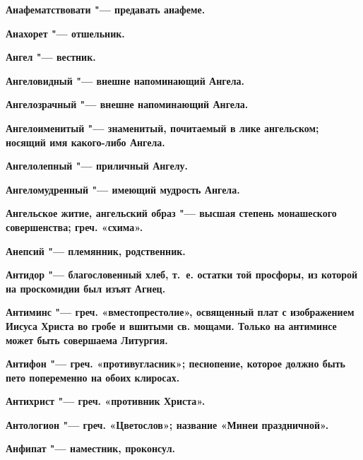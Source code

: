 \begin{mymulticols}{2}
\bfseries Анафематствовати\normalfont{} "--- предавать анафеме. 




\bfseries Анахорет\normalfont{} "--- отшельник. 




\bfseries Ангел\normalfont{} "--- вестник. 




\bfseries Ангеловидный\normalfont{} "--- внешне напоминающий Ангела. 




\bfseries Ангелозрачный\normalfont{} "--- внешне напоминающий Ангела. 




\bfseries Ангелоименитый\normalfont{} "--- знаменитый, почитаемый в лике ангельском; носящий имя какого-либо Ангела. 




\bfseries Ангелолепный\normalfont{} "--- приличный Ангелу. 




\bfseries Ангеломудренный\normalfont{} "--- имеющий мудрость Ангела. 




\bfseries Ангельское житие, ангельский образ\normalfont{} "--- высшая степень монашеского совершенства; греч. «схима». 




\bfseries Анепсий\normalfont{} "--- племянник, родственник. 




\bfseries Антидор\normalfont{} "--- благословенный хлеб, т.~е. остатки той просфоры, из которой на проскомидии был изъят Агнец. 




\bfseries Антиминс\normalfont{} "--- греч. «вместопрестолие», освященный плат с изображением Иисуса Христа во гробе и вшитыми св. мощами. Только на антиминсе может быть совершаема Литургия. 




\bfseries Антифон\normalfont{} "--- греч. «противугласник»; песнопение, которое должно быть пето попеременно на обоих клиросах. 




\bfseries Антихрист\normalfont{} "--- греч. «противник Христа». 




\bfseries Антологион\normalfont{} "--- греч. «Цветослов»; название «Минеи праздничной». 




\bfseries Анфипат\normalfont{} "--- наместник, проконсул. 





\end{mymulticols}
